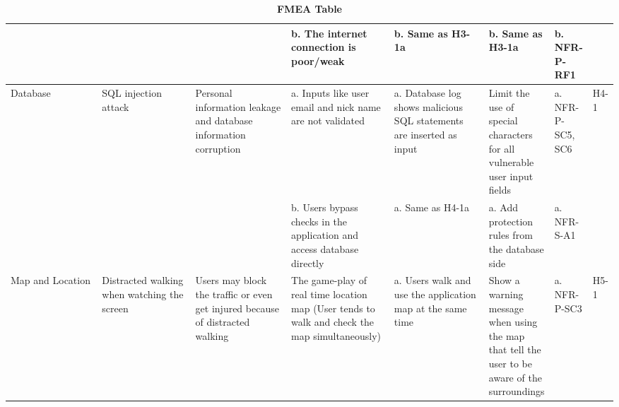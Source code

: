 \documentclass{article}
\begin{document}
\begin{table}[H]
\begin{adjustbox}{width=(/5)}
\begin{tabular}{|p{0.20\linewidth} | p{0.20\linewidth} | p{0.20\linewidth}|  p{0.20\linewidth}|  p{0.21\linewidth}|  p{0.30\linewidth}|  p{0.08\linewidth}|p{0.07\linewidth}| }
        &&&  b. The internet connection is poor/weak    &        b. Same as H3-1a         &  b. Same as H3-1a           &  b. NFR-P-RF1           &\\
          \hline
          Database           &    SQL injection attack         &           Personal information leakage and database information corruption           &           a. Inputs like user email and nick name are not validated           &           a. Database log shows malicious SQL statements are inserted as input           &     Limit the use of special characters for all vulnerable user input fields     &   a. NFR-P-SC5, SC6         &      H4-1            \\
                                   &&&           b. Users bypass checks in the application and access database directly            &            a. Same as H4-1a            &            a. Add protection rules from the database side      &  a. NFR-S-A1          &\\
          \hline
          Map and Location           &    Distracted walking when watching the screen         &           Users may block the traffic or even get injured because of distracted walking           &           The game-play of real time location map (User tends to walk and check the map simultaneously)           &           a. Users walk and use the application map at the same time           &     Show a warning message when using the map that tell the user to be aware of the surroundings     &   a. NFR-P-SC3          &      H5-1            \\
          \hline
    \end{tabular}
    \end{adjustbox}
    \caption{\bf FMEA Table}
    \label{tab:FMEA1}
\end{table}
\end{document}
